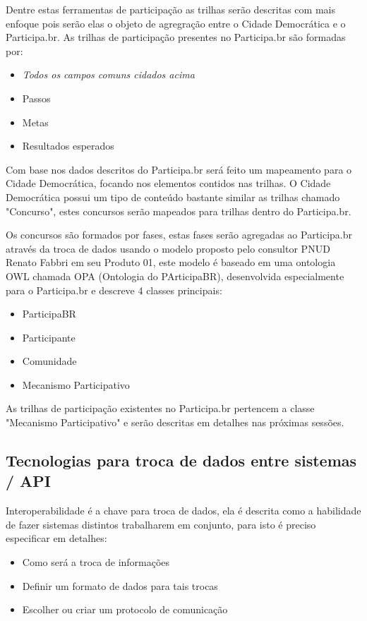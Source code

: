 \documentclass[12pt]{article}
\begin{document}
Dentre estas ferramentas de participação as trilhas serão descritas com mais
enfoque pois serão elas o objeto de agregração entre o Cidade Democrática e o
Participa.br. As trilhas de participação presentes no Participa.br são
formadas por:

\begin{itemize}
  \item {\it Todos os campos comuns cidados acima}
  \item Passos
  \item Metas
  \item Resultados esperados
\end{itemize}

Com base nos dados descritos do Participa.br será feito um mapeamento
para o Cidade Democrática, focando nos elementos contidos nas trilhas. O Cidade
Democrática possui um tipo de conteúdo bastante similar as trilhas chamado
"Concurso", estes concursos serão mapeados para trilhas dentro do
Participa.br.

Os concursos são formados por fases, estas fases serão agregadas ao
Participa.br através da troca de dados usando o modelo proposto pelo consultor
PNUD Renato Fabbri em seu Produto 01\cite{fabri}, este modelo é baseado em uma
ontologia OWL chamada OPA (Ontologia do PArticipaBR), desenvolvida
especialmente para o Participa.br e descreve 4 classes principais:

\begin{itemize}
  \item ParticipaBR
  \item Participante
  \item Comunidade
  \item Mecanismo Participativo
\end{itemize}

As trilhas de participação existentes no Participa.br pertencem a classe "Mecanismo
Participativo" e serão descritas em detalhes nas próximas sessões.

\subsection{Tecnologias para troca de dados entre sistemas / API}

Interoperabilidade é a chave para troca de dados, ela é descrita como a
habilidade de fazer sistemas distintos trabalharem em conjunto, para isto é
preciso especificar em detalhes:

\begin{itemize}
  \item Como será a troca de informações
  \item Definir um formato de dados para tais trocas
  \item Escolher ou criar um protocolo de comunicação
\end{itemize}
\end{document}
